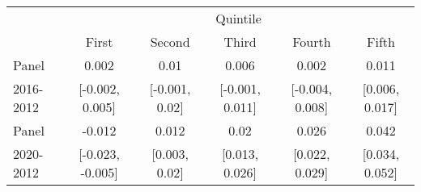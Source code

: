 \begin{tabular}{l|ccccc}
\hline \hline
        & \multicolumn{5}{c}{Quintile} \\
        & First & Second & Third & Fourth & Fifth \\
\hline
Panel  &  0.002 & 0.01 & 0.006 & 0.002 & 0.011 \\ 
 2016-2012 & [-0.002, 0.005] & [-0.001, 0.02] & [-0.001, 0.011] & [-0.004, 0.008] & [0.006, 0.017] \\ 
 \hline
Panel  &  -0.012 & 0.012 & 0.02 & 0.026 & 0.042 \\ 
 2020-2012 & [-0.023, -0.005] & [0.003, 0.02] & [0.013, 0.026] & [0.022, 0.029] & [0.034, 0.052] \\ 
 \hline
\hline
\end{tabular}
